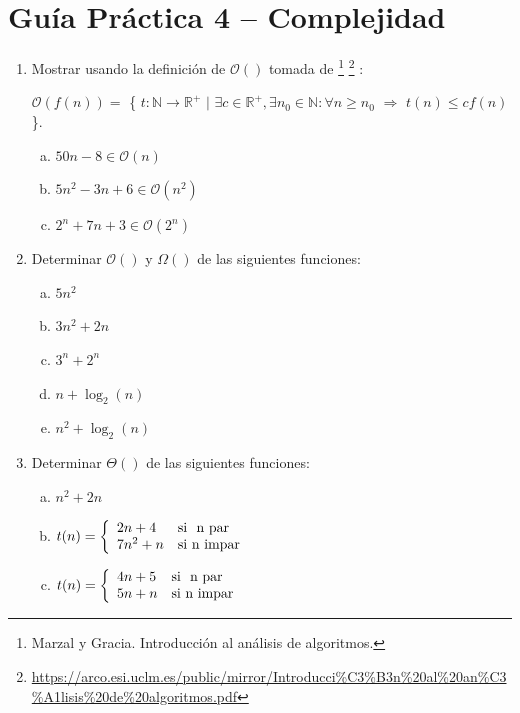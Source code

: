 




\section*{Gu\'ia Pr\'actica 4 -- Complejidad}

\begin{enumerate}
	\item Mostrar usando la definición de $\mathcal{O}()$ tomada de \footnote{Marzal y Gracia. Introducción al análisis de algoritmos.} \footnote{\href{https://arco.esi.uclm.es/public/mirror/Introducci\%C3\%B3n\%20al\%20an\%C3\%A1lisis\%20de\%20algoritmos.pdf}{https://arco.esi.uclm.es/public/mirror/Introducci\%C3\%B3n\%20al\%20an\%C3\%A1lisis\%20de\%20algoritmos.pdf}} : \\
	\vspace*{-7mm}
	\begin{center}
		$\mathcal{O}(f(n)) = $ \{ $t: \mathbb{N} \rightarrow \mathbb{R}^+$ $|$  $\exists c \in \mathbb{R}^+, 
		\exists n_0 \in \mathbb{N} : \forall n \geq n_0$  $\Rightarrow$   $t(n) \leq c f(n)$ \}.
	\end{center}
	
		\begin{enumerate}[a)]
			\item $50n-8 \in \mathcal{O}(n)$ 
			\item $5n^2-3n + 6 \in \mathcal{O}(n^2)$
			\item $2^n + 7n + 3 \in \mathcal{O}(2^n)$ 			
		\end{enumerate}
		
	\item Determinar $\mathcal{O}()$ y $\Omega()$ de las siguientes funciones:
		\begin{enumerate}[a)]
			\item $5n^2$ 
			\item $3n^2 + 2n$ 			
			\item $3^n + 2^n$ 
			\item $n + \log_2(n)$ 			
			\item $n^2 + \log_2(n)$ 			
		\end{enumerate}	
		
	\item Determinar $\Theta()$ de las siguientes funciones:
		\begin{enumerate}[a)]
			\item $n^2 + 2n$ 
			\item $t(n) = \twopartdef { 2n + 4 } {$ n  par $} {7n^2 + n} {$n impar$}$
			\item $t(n) = \twopartdef { 4n + 5 } {$ n  par $} {5n + n} {$n impar$}$
		\end{enumerate}	
		

\end{enumerate}
